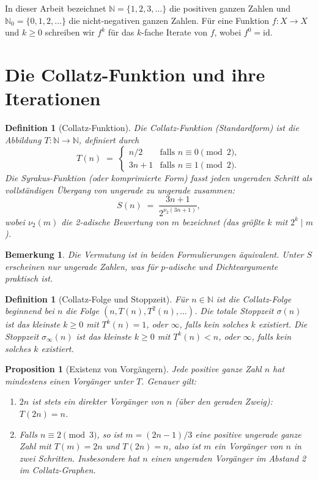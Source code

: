 \documentclass[12pt,a4paper]{article}
\newtheorem{proposition}[theorem]{Proposition}
\newtheorem{definition}[theorem]{Definition}
\newtheorem{remark}[theorem]{Bemerkung}
\begin{document}
In dieser Arbeit bezeichnet $\mathbb{N} = \{1, 2, 3, \ldots\}$ die positiven ganzen
Zahlen und $\mathbb{N}_0 = \{0, 1, 2, \ldots\}$ die nicht-negativen ganzen Zahlen.
Für eine Funktion $f\colon X \to X$ und $k \geq 0$ schreiben wir $f^k$ für das
$k$-fache Iterate von $f$, wobei $f^0 = \mathrm{id}$.

\section{Die Collatz-Funktion und ihre Iterationen}

\begin{definition}[Collatz-Funktion]\label{def:collatz}
Die \emph{Collatz-Funktion} (Standardform) ist die Abbildung $T\colon \mathbb{N} \to \mathbb{N}$,
definiert durch
\[
  T(n) \;=\; \begin{cases} n/2 & \text{falls } n \equiv 0 \pmod{2}, \\
                            3n+1 & \text{falls } n \equiv 1 \pmod{2}.
              \end{cases}
\]
Die \emph{Syrakus-Funktion} (oder komprimierte Form) fasst jeden ungeraden Schritt als
vollständigen Übergang von ungerade zu ungerade zusammen:
\[
  S(n) \;=\; \frac{3n+1}{2^{\nu_2(3n+1)}},
\]
wobei $\nu_2(m)$ die 2-adische Bewertung von $m$ bezeichnet (das größte $k$ mit $2^k \mid m$).
\end{definition}

\begin{remark}\label{rem:equivalent}
Die Vermutung ist in beiden Formulierungen äquivalent. Unter $S$ erscheinen nur ungerade
Zahlen, was für $p$-adische und Dichteargumente praktisch ist.
\end{remark}

\begin{definition}[Collatz-Folge und Stoppzeit]\label{def:sequence}
Für $n \in \mathbb{N}$ ist die \emph{Collatz-Folge} beginnend bei $n$ die Folge
$(n, T(n), T^2(n), \ldots)$.
Die \emph{totale Stoppzeit} $\sigma(n)$ ist das kleinste $k \geq 0$ mit $T^k(n) = 1$,
oder $\infty$, falls kein solches $k$ existiert.
Die \emph{Stoppzeit} $\sigma_\infty(n)$ ist das kleinste $k \geq 0$ mit $T^k(n) < n$,
oder $\infty$, falls kein solches $k$ existiert.
\end{definition}

\begin{proposition}[Existenz von Vorgängern]\label{prop:pred}
Jede positive ganze Zahl $n$ hat mindestens einen Vorgänger unter $T$. Genauer gilt:
\begin{enumerate}
  \item[(i)] $2n$ ist stets ein direkter Vorgänger von $n$ (über den geraden Zweig): $T(2n) = n$.
  \item[(ii)] Falls $n \equiv 2 \pmod{3}$, so ist $m = (2n-1)/3$ eine positive ungerade
              ganze Zahl mit $T(m) = 2n$ und $T(2n) = n$, also ist $m$ ein Vorgänger
              von $n$ in zwei Schritten. Insbesondere hat $n$ einen ungeraden Vorgänger
              im Abstand 2 im Collatz-Graphen.
\end{enumerate}
\end{proposition}
\end{document}
